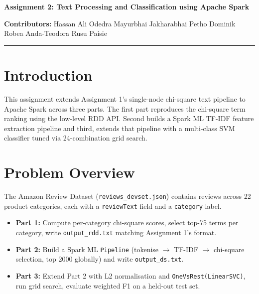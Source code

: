 \documentclass[11pt,a4paper]{extarticle}
\begin{document}
\sloppy

\begin{center}
  {\LARGE\bfseries Assignment 2: Text Processing and Classification using Apache Spark}\\[0.6em]
\end{center}

\vspace{0.4em}
\noindent\textbf{Contributors:}
Hassan Ali \quad Odedra Mayurbhai Jakharabhai \quad Petho Dominik \quad Robea Anda-Teodora \quad Rusu Paisie
\vspace{0.3em}\hrule\vspace{0.5em}

\section{Introduction}

This assignment extends Assignment 1's single-node chi-square text pipeline to Apache Spark across three parts. The first part reproduces the chi-square term ranking using the low-level RDD API. Second builds a Spark ML TF-IDF feature extraction pipeline and third, extends that pipeline with a multi-class SVM classifier tuned via 24-combination grid search.

\section{Problem Overview}

The Amazon Review Dataset (\texttt{reviews\_devset.json}) contains reviews across 22 product categories, each with a \texttt{reviewText} field and a \texttt{category} label.

\begin{itemize}
  \item \textbf{Part 1:} Compute per-category chi-square scores, select top-75 terms per category, write \texttt{output\_rdd.txt} matching Assignment 1's format.
  \item \textbf{Part 2:} Build a Spark ML \texttt{Pipeline} (tokenise $\to$ TF-IDF $\to$ chi-square selection, top 2000 globally) and write \texttt{output\_ds.txt}.
  \item \textbf{Part 3:} Extend Part 2 with L2 normalisation and \texttt{OneVsRest(LinearSVC)}, run grid search, evaluate weighted F1 on a held-out test set.
\end{itemize}
\end{document}
